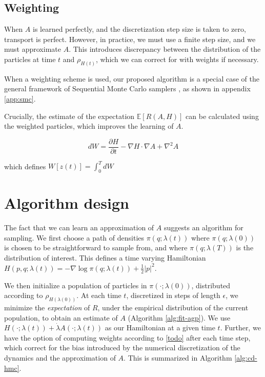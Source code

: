 \documentclass{article}
\begin{document}
\subsection{Weighting}

When $A$ is learned perfectly, and the discretization step size is taken to zero, transport is perfect. However, in practice, we must use a finite step size, and we must approximate $A$. This introduces discrepancy between the distribution of the particles at time $t$ and $\rho_{H(t)}$, which we can correct for with weights if necessary.

When a weighting scheme is used, our proposed algorithm is a special case of the general framework of Sequential Monte Carlo samplers \cite{doucet2001sequential}, as shown in appendix \ref{app:smc}.

Crucially, the estimate of the expectation $\mathbb{E}[R(A, H)]$ can be calculated using the weighted particles, which improves the learning of $A$.








% 







$$dW = \frac{\partial H}{\partial t} - \nabla H\cdot \nabla A + \nabla^2 A$$

which defines $W[z(t)] = \int_0^T dW$


\section{Algorithm design}

The fact that we can learn an approximation of $A$ suggests an algorithm for sampling. We first choose a path of densities $\pi(q;\lambda(t))$ where $\pi(q;\lambda(0))$ is chosen to be straightforward to sample from, and where $\pi(q;\lambda(T))$ is the distribution of interest. This defines a time varying Hamiltonian $H(p,q; \lambda(t)) = - \nabla \log \pi(q;\lambda(t)) + \frac{1}{2}|p|^2$. 

We then initialize a population of particles in $\pi(\cdot ; \lambda(0))$, distributed according to $\rho_{H(\lambda(0))}$. At each time $t$, discretized in steps of length $\epsilon$, we minimize the \emph{expectation} of $R$, under the empirical distribution of the current population, to obtain an estimate of $A$ (Algorithm \ref{alg:fit-agp}). We use $H(\cdot ; \lambda(t)) + \dot\lambda A(\cdot ; \lambda(t))$ as our Hamiltonian at a given time $t$. Further, we have the option of computing weights according to \eqref{todo} after each time step, which correct for the bias introduced by the numerical discretization of the dynamics and the approximation of $A$. This is summarized in Algorithm \ref{alg:cd-hmc}.
\end{document}

